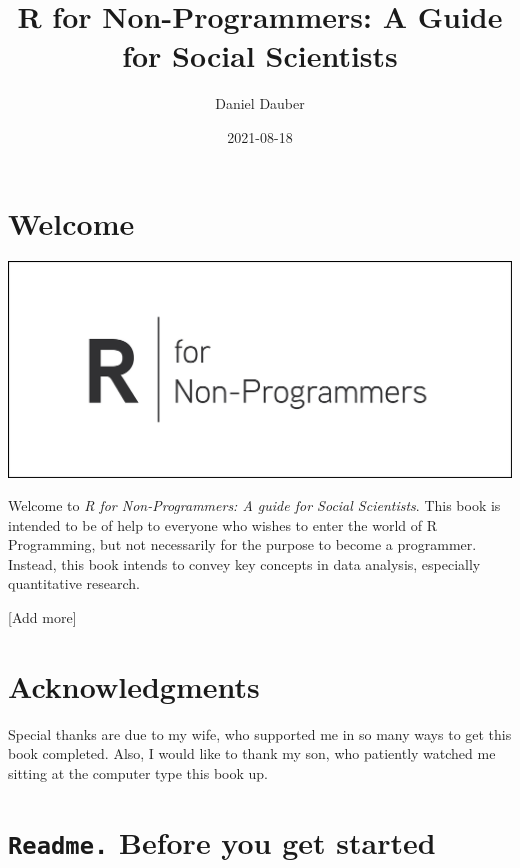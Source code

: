 \documentclass[
]{book}
\title{R for Non-Programmers: A Guide for Social Scientists}
\author{Daniel Dauber}
\date{2021-08-18}
\begin{document}
\maketitle

{
\setcounter{tocdepth}{1}
\tableofcontents
}
\hypertarget{welcome}{%
\chapter*{Welcome 👋}\label{welcome}}

\includegraphics{images/chapter_00_img/r_for_non_programmers_logo.png}

Welcome to \emph{R for Non-Programmers: A guide for Social Scientists}. This book is intended to be of help to everyone who wishes to enter the world of R Programming, but not necessarily for the purpose to become a programmer. Instead, this book intends to convey key concepts in data analysis, especially quantitative research.

{[}Add more{]}

\hypertarget{acknowledgments}{%
\chapter*{Acknowledgments 🙏}\label{acknowledgments}}

Special thanks are due to my wife, who supported me in so many ways to get this book completed. Also, I would like to thank my son, who patiently watched me sitting at the computer type this book up.

\hypertarget{readme-before-you-get-started}{%
\chapter{\texorpdfstring{\texttt{Readme.} Before you get started}{Readme. Before you get started}}\label{readme-before-you-get-started}}
\end{document}
